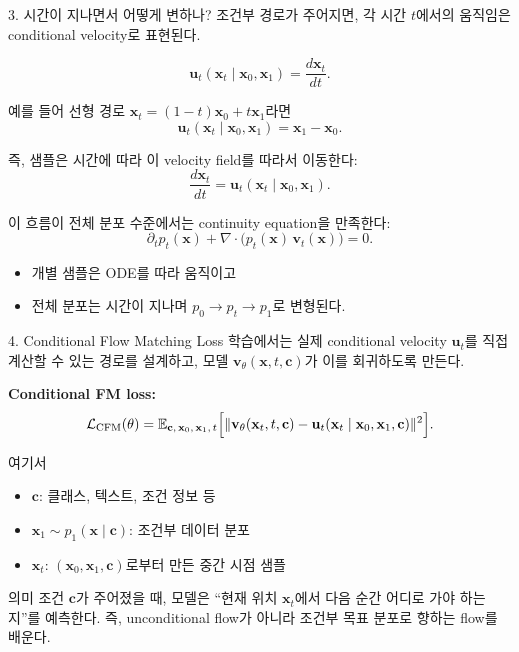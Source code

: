 \documentclass[aspectratio=169,11pt]{beamer}
\newcommand{\E}{\mathbb{E}}
\newcommand{\vx}{\mathbf{x}}
\newcommand{\vu}{\mathbf{u}}
\newcommand{\vv}{\mathbf{v}}
\begin{document}
\begin{frame}{3. 시간이 지나면서 어떻게 변하나?}
\small
조건부 경로가 주어지면, 각 시간 $t$에서의 움직임은 conditional velocity로 표현된다.

\[
\vu_t(\vx_t \mid \vx_0, \vx_1) = \frac{d\vx_t}{dt}.
\]

예를 들어 선형 경로 $\vx_t = (1-t)\vx_0 + t\vx_1$라면
\[
\vu_t(\vx_t \mid \vx_0, \vx_1) = \vx_1 - \vx_0.
\]

즉, 샘플은 시간에 따라 이 velocity field를 따라서 이동한다:
\[
\frac{d\vx_t}{dt} = \vu_t(\vx_t \mid \vx_0, \vx_1).
\]

이 흐름이 전체 분포 수준에서는 continuity equation을 만족한다:
\[
\partial_t p_t(\vx) + \nabla \cdot \bigl(p_t(\vx) \, \vv_t(\vx)\bigr) = 0.
\]

\begin{itemize}
  \item 개별 샘플은 ODE를 따라 움직이고
  \item 전체 분포는 시간이 지나며 $p_0 \to p_t \to p_1$로 변형된다.
\end{itemize}
\end{frame}

\begin{frame}{4. Conditional Flow Matching Loss}
\small
학습에서는 실제 conditional velocity $\vu_t$를 직접 계산할 수 있는 경로를 설계하고,
모델 $\vv_\theta(\vx,t,\mathbf{c})$가 이를 회귀하도록 만든다.

\vspace{0.3em}
\textbf{Conditional FM loss:}
\[
\mathcal{L}_{\mathrm{CFM}}(\theta)
=
\E_{\mathbf{c},\,\vx_0,\,\vx_1,\,t}
\Bigl[
\| \vv_\theta(\vx_t,t,\mathbf{c}) - \vu_t(\vx_t\mid \vx_0,\vx_1,\mathbf{c}) \|^2
\Bigr].
\]

여기서
\begin{itemize}
  \item $\mathbf{c}$: 클래스, 텍스트, 조건 정보 등
  \item $\vx_1 \sim p_1(\vx \mid \mathbf{c})$: 조건부 데이터 분포
  \item $\vx_t$: $(\vx_0, \vx_1, \mathbf{c})$로부터 만든 중간 시점 샘플
\end{itemize}

\begin{block}{의미}
조건 $\mathbf{c}$가 주어졌을 때, 모델은 ``현재 위치 $\vx_t$에서 다음 순간 어디로 가야 하는지''를 예측한다.
즉, unconditional flow가 아니라 \alert{조건부 목표 분포로 향하는 flow}를 배운다.
\end{block}
\end{frame}
\end{document}
